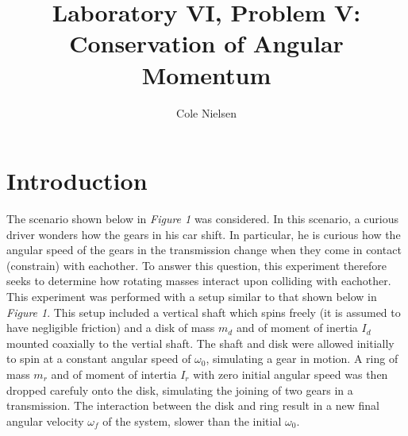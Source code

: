 \documentclass[12pt,letterpaper]{article}
\begin{document}
\title{Laboratory VI, Problem V: Conservation of Angular Momentum}
\author[]{Cole Nielsen}
\date{}
\pdfpagewidth 8.5in
\pdfpageheight 11in
%
%
\maketitle
%

\section{Introduction}
The scenario shown below in \textit{Figure 1} was considered. In this scenario, a curious driver wonders how the gears in his car shift. In particular, he is curious how the angular speed of the gears in the transmission change when they come in contact (constrain) with eachother. To answer this question, this experiment therefore seeks to determine how rotating masses interact upon colliding with eachother. This experiment was performed with a setup similar to that shown below in \textit{Figure 1}. This setup included a vertical shaft which spins freely (it is assumed to have negligible friction) and a disk of mass \(m_d\) and of moment of inertia \(I_d\) mounted coaxially to the vertial shaft. The shaft and disk were allowed initially to spin at a constant angular speed of \(\omega_0\), simulating a gear in motion. A ring of mass \(m_r\) and of moment of intertia \(I_r\) with zero initial angular speed was then dropped carefuly onto the disk, simulating the joining of two gears in a transmission. The interaction between the disk and ring result in a new final angular velocity \(\omega_f\) of the system, slower than the initial \(\omega_0\).
\end{document}
